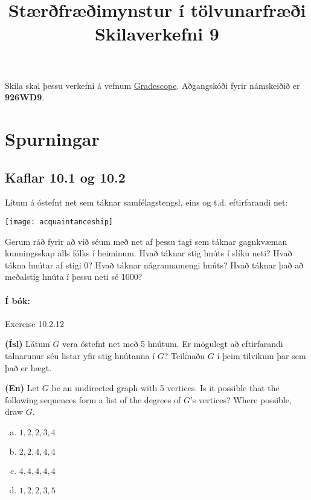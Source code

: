 \documentclass{exam}
\title{Stærðfræðimynstur í tölvunarfræði \\ Skilaverkefni 9}
\author{}
\begin{document}
\maketitle
\thispagestyle{empty} 

Skila skal þessu verkefni á vefnum \href{https://gradescope.com/}{Gradescope}. Aðgangskóði fyrir námskeiðið er \textbf{926WD9}.


\section{Spurningar}

\begin{questions}

\section{Kaflar 10.1 og 10.2}

\question Lítum á óstefnt net sem táknar samfélagstengsl, eins og t.d. eftirfarandi net:

\begin{center}
\texttt{[image: acquaintanceship]}
\end{center}

Gerum ráð fyrir að við séum með net af þessu tagi sem táknar gagnkvæman kunningsskap alls fólks í heiminum. Hvað táknar stig hnúts í slíku neti? Hvað tákna hnútar af stigi 0? Hvað táknar nágrannamengi hnúts? Hvað táknar það að meðalstig hnúta í þessu neti sé 1000?

\paragraph{Í bók:} Exercise 10.2.12

\question 

\textbf{(Ísl)} Látum $G$ vera óstefnt net með 5 hnútum. Er mögulegt að eftirfarandi talnarunur séu listar yfir stig hnútanna í $G$? Teiknaðu $G$ í þeim tilvikum þar sem það er hægt.

\textbf{(En)} Let $G$ be an undirected graph with 5 vertices. Is it possible that the following sequences form a list of the degrees of $G$'s vertices? Where possible, draw $G$.

\begin{enumerate}[a)]
\item $1,2,2,3,4$
\item $2,2,4,4,4$
\item $4,4,4,4,4$
\item $1,2,2,3,5$
\end{enumerate}


\end{questions}
\end{document}
